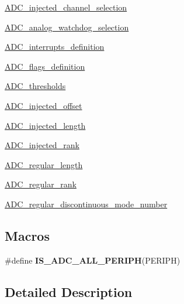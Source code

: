 \begin{DoxyCompactItemize}
\item 
\hyperlink{group___a_d_c__injected__channel__selection}{A\-D\-C\-\_\-injected\-\_\-channel\-\_\-selection}
\item 
\hyperlink{group___a_d_c__analog__watchdog__selection}{A\-D\-C\-\_\-analog\-\_\-watchdog\-\_\-selection}
\item 
\hyperlink{group___a_d_c__interrupts__definition}{A\-D\-C\-\_\-interrupts\-\_\-definition}
\item 
\hyperlink{group___a_d_c__flags__definition}{A\-D\-C\-\_\-flags\-\_\-definition}
\item 
\hyperlink{group___a_d_c__thresholds}{A\-D\-C\-\_\-thresholds}
\item 
\hyperlink{group___a_d_c__injected__offset}{A\-D\-C\-\_\-injected\-\_\-offset}
\item 
\hyperlink{group___a_d_c__injected__length}{A\-D\-C\-\_\-injected\-\_\-length}
\item 
\hyperlink{group___a_d_c__injected__rank}{A\-D\-C\-\_\-injected\-\_\-rank}
\item 
\hyperlink{group___a_d_c__regular__length}{A\-D\-C\-\_\-regular\-\_\-length}
\item 
\hyperlink{group___a_d_c__regular__rank}{A\-D\-C\-\_\-regular\-\_\-rank}
\item 
\hyperlink{group___a_d_c__regular__discontinuous__mode__number}{A\-D\-C\-\_\-regular\-\_\-discontinuous\-\_\-mode\-\_\-number}
\end{DoxyCompactItemize}
\subsection*{Macros}
\begin{DoxyCompactItemize}
\item 
\#define {\bfseries I\-S\-\_\-\-A\-D\-C\-\_\-\-A\-L\-L\-\_\-\-P\-E\-R\-I\-P\-H}(P\-E\-R\-I\-P\-H)
\end{DoxyCompactItemize}


\subsection{Detailed Description}


